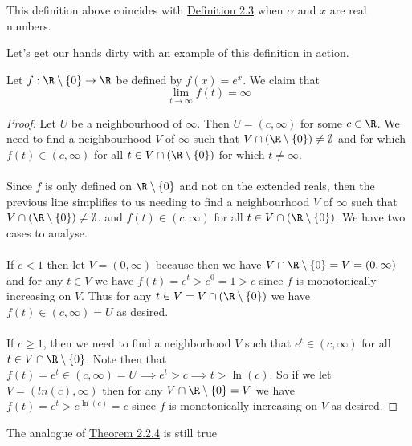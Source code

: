 	 
	 \begin{remark}
	 	This definition above coincides with \hyperlink{limit-function-defn}{Definition 2.3} when $\alpha$ and $x$ are real numbers.
	 \end{remark}
	 
	 Let's get our hands dirty with an example of this definition in action.
	 
	 \begin{example}
	 	Let $f : \R \setminus \{0\} \to \R$ be defined by $f(x) = e^x$. We claim that $$\lim_{t \to \infty} f(t) = \infty$$
	 \end{example}
	 
	 \begin{proof}
	 	Let $U$ be a neighbourhood of $\infty$. Then $U = (c, \infty)$ for some $c \in \R$. We need to find a neighbourhood $V$ of $\infty$ such that $V \cap\left(  \R \setminus \{0\}\right) \neq \emptyset $ and for which $f(t) \in (c, \infty)$ for all $t \in V \cap\left(  \R \setminus \{0\}\right) $ for which $t \neq \infty$. \\ \\
	 	Since $f$ is only defined on $\R \setminus \{0\}$ and not on the extended reals, then the  previous line simplifies to us needing to find a neighbourhood $V$ of $\infty$ such that $V \cap\left(  \R \setminus \{0\}\right) \neq \emptyset $. and $f(t) \in (c, \infty)$ for all $t \in V \cap\left(  \R \setminus \{0\}\right) $.  We have two cases to analyse.\\ \\
	 	If $c < 1$ then let $V = (0, \infty)$ because then we have $V \cap \R \setminus \{0\} = V = (0, \infty)$ and for any $t \in V$ we have $f(t) = e^t > e^0 = 1 > c$ since $f$ is monotonically increasing on $V$. Thus for any $t \in V = V \cap\left(  \R \setminus \{0\}\right)$ we have $f(t) \in (c, \infty) = U$ as desired. \\ \\
	 	If $ c \geq 1$, then we need to find a neighborhood $V$ such that $e^t \in (c, \infty)$ for all $t \in V \cap \R \setminus \{0\}$. Note then that $f(t) = e^t \in (c, \infty) = U \implies e^t > c \implies t > \ln(c)$. So if we let $V = (ln(c), \infty)$ then for any $V \cap \R \setminus \{0\} = V$ we have $f(t) = e^t > e^{\ln(c)} = c$ since $f$ is monotonically increasing on $V$ as desired.
	 \end{proof}
	 
	 
	 
	 The analogue of \hyperlink{limit-thm}{Theorem 2.2.4} is still true 
	 
